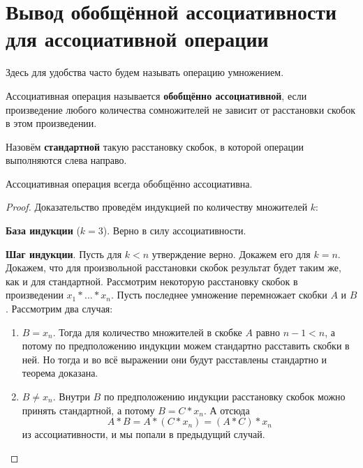 \section{Вывод обобщённой ассоциативности для ассоциативной операции}

\begin{remark}
    Здесь для удобства часто будем называть операцию умножением.
\end{remark}

\begin{definition}
    Ассоциативная операция называется \textbf{обобщённо ассоциативной}, если произведение любого количества сомножителей не зависит от расстановки скобок в этом произведении.
\end{definition}

\begin{definition}
    Назовём \textbf{стандартной} такую расстановку скобок, в которой операции выполняются слева направо.
\end{definition}

\begin{theorem}
    Ассоциативная операция всегда обобщённо ассоциативна.
\end{theorem}

\begin{proof}
    Доказательство проведём индукцией по количеству множителей $k$:
    
    \textbf{База индукции} ($k = 3$). Верно в силу ассоциативности.

    \textbf{Шаг индукции}. Пусть для $k < n$ утверждение верно. Докажем его для $k = n$. Докажем, что для произвольной расстановки скобок результат будет таким же, как и для стандартной. Рассмотрим некоторую расстановку скобок в произведении $x_1 \ast \ldots \ast x_n$. Пусть последнее умножение перемножает скобки $A$ и $B$. Рассмотрим два случая:
    \begin{enumerate}
        \item $B = x_n$. Тогда для количество множителей в скобке $A$ равно $n - 1 < n$, а потому по предположению индукции можем стандартно расставить скобки в ней. Но тогда и во всё выражении они будут расставлены стандартно и теорема доказана.
        \item $B \ne x_n$. Внутри $B$ по предположению индукции расстановку скобок можно принять стандартной, а потому $B = C \ast x_n$. А отсюда
            $$
            A \ast B = A \ast (C \ast x_n) = (A \ast C) \ast x_n
            $$
            из ассоциативности, и мы попали в предыдущий случай.
    \end{enumerate}
\end{proof}

